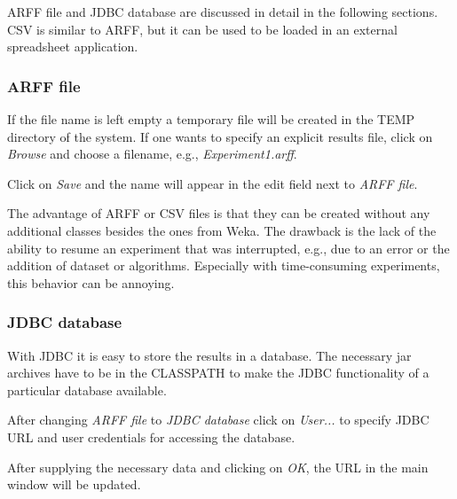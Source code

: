 ARFF file and JDBC database are discussed in detail in the following sections. CSV is similar to ARFF, but it can be used to be loaded in an external spreadsheet application.


\subsubsection*{ARFF file}

If the file name is left empty a temporary file will be created in the TEMP directory of the system. If one wants to specify an explicit results file, click on \textit{Browse} and choose a filename, e.g., \textit{Experiment1.arff}.

\begin{center}
\end{center}


Click on \textit{Save} and the name will appear in the edit field next to \textit{ARFF file}.

\begin{center}
\end{center}


The advantage of ARFF or CSV files is that they can be created without any additional classes besides the ones from Weka. The drawback is the lack of the ability to resume an experiment that was interrupted, e.g., due to an error or the addition of dataset or algorithms. Especially with time-consuming experiments, this behavior can be annoying.


\subsubsection*{JDBC database}

With JDBC it is easy to store the results in a database. The necessary jar archives have to be in the CLASSPATH to make the JDBC functionality of a particular database available.

After changing \textit{ARFF file} to \textit{JDBC database} click on \textit{User...} to specify JDBC URL and user credentials for accessing the database.

\begin{center}
\end{center}


After supplying the necessary data and clicking on \textit{OK}, the URL in the main window will be updated.

